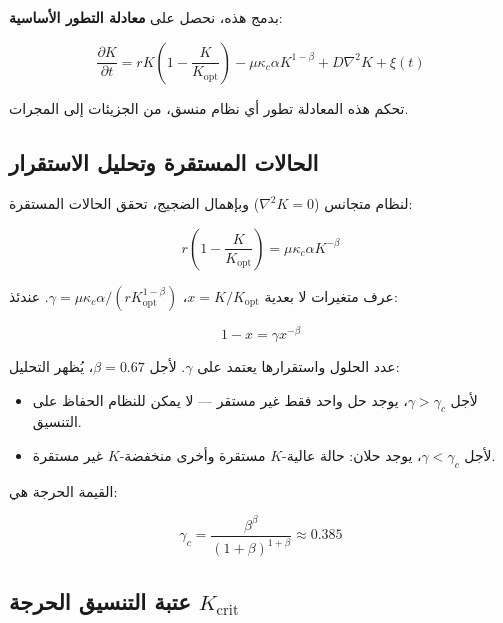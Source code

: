 \documentclass[11pt,a4paper]{article}
\newcommand{\Keffopt}{K_{\mathrm{opt}}}
\newcommand{\Keffcrit}{K_{\mathrm{crit}}}
\newcommand{\kappac}{\kappa_c}
\begin{document}
	بدمج هذه، نحصل على \textbf{معادلة التطور الأساسية}:
	
	\begin{equation}
		\boxed{\frac{\partial K}{\partial t} = r K \left(1 - \frac{K}{\Keffopt}\right) - \mu \kappac \alpha K^{1-\beta} + D \nabla^2 K + \xi(t)}
		\label{eq:evolution}
	\end{equation}
	
	تحكم هذه المعادلة تطور أي نظام منسق، من الجزيئات إلى المجرات.
	
	\subsection{الحالات المستقرة وتحليل الاستقرار}
	
	لنظام متجانس (\(\nabla^2 K = 0\)) وبإهمال الضجيج، تحقق الحالات المستقرة:
	
	\begin{equation}
		r \left(1 - \frac{K}{\Keffopt}\right) = \mu \kappac \alpha K^{-\beta}
		\label{eq:stationary}
	\end{equation}
	
	عرف متغيرات لا بعدية \(x = K/\Keffopt\)، \(\gamma = \mu \kappac \alpha / (r \Keffopt^{1-\beta})\). عندئذ:
	
	\begin{equation}
		1 - x = \gamma x^{-\beta}
		\label{eq:dimensionless}
	\end{equation}
	
	عدد الحلول واستقرارها يعتمد على \(\gamma\). لأجل \(\beta = 0.67\)، يُظهر التحليل:
	
	\begin{itemize}
		\item لأجل \(\gamma > \gamma_c\)، يوجد حل واحد فقط غير مستقر — لا يمكن للنظام الحفاظ على التنسيق.
		\item لأجل \(\gamma < \gamma_c\)، يوجد حلان: حالة عالية-\(K\) مستقرة وأخرى منخفضة-\(K\) غير مستقرة.
	\end{itemize}
	
	القيمة الحرجة هي:
	
	\begin{equation}
		\gamma_c = \frac{\beta^{\beta}}{(1+\beta)^{1+\beta}} \approx 0.385
		\label{eq:gamma_c}
	\end{equation}
	
	\subsection{عتبة التنسيق الحرجة \(\Keffcrit\)}
	
\end{document}
